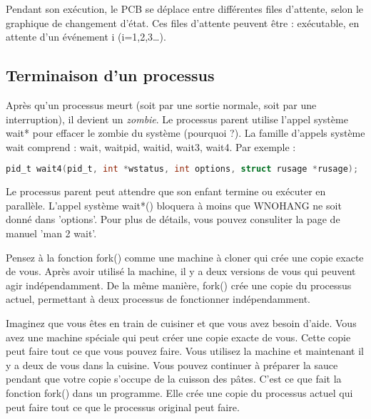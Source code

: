 \documentclass[12pt]{report}
\begin{document}
Pendant son exécution, le PCB se déplace entre différentes files d'attente, selon le graphique de changement d'état. Ces files d'attente peuvent être : exécutable, en attente d'un événement i (i=1,2,3…).

\subsection{Terminaison d'un processus}

Après qu'un processus meurt (soit par une sortie normale, soit par une interruption), il devient un \textit{zombie}. Le processus parent utilise l'appel système wait* pour effacer le zombie du système (pourquoi ?). La famille d'appels système wait comprend : wait, waitpid, waitid, wait3, wait4. Par exemple :

\begin{lstlisting}[language=C]
pid_t wait4(pid_t, int *wstatus, int options, struct rusage *rusage);
\end{lstlisting}

Le processus parent peut attendre que son enfant termine ou exécuter en parallèle. L'appel système wait*() bloquera à moins que WNOHANG ne soit donné dans 'options'. Pour plus de détails, vous pouvez consuliter la page de manuel 'man 2 wait'.

\begin{tcolorbox}[
     colback=green!10,
     colframe=green,
     title={\fontfamily{lmr}\selectfont \faLightbulb\ Intuition},
     fonttitle=\bfseries,
     fontupper=\fontfamily{lmr}\selectfont,
     boxrule=1pt,
     sharp corners,
     ]

Pensez à la fonction fork() comme une machine à cloner qui crée une copie exacte de vous. Après avoir utilisé la machine, il y a deux versions de vous qui peuvent agir indépendamment. De la même manière, fork() crée une copie du processus actuel, permettant à deux processus de fonctionner indépendamment.

\end{tcolorbox}
\begin{tcolorbox}[
     colback=blue!10,
     colframe=blue,
     title={\fontfamily{lmr}\selectfont \faComment\ Vulgarisation simple},
     fonttitle=\bfseries,
     fontupper=\fontfamily{lmr}\selectfont,
     boxrule=1pt,
     sharp corners,
     ]

Imaginez que vous êtes en train de cuisiner et que vous avez besoin d'aide. Vous avez une machine spéciale qui peut créer une copie exacte de vous. Cette copie peut faire tout ce que vous pouvez faire. Vous utilisez la machine et maintenant il y a deux de vous dans la cuisine. Vous pouvez continuer à préparer la sauce pendant que votre copie s'occupe de la cuisson des pâtes. C'est ce que fait la fonction fork() dans un programme. Elle crée une copie du processus actuel qui peut faire tout ce que le processus original peut faire.

\end{tcolorbox}
\end{document}
